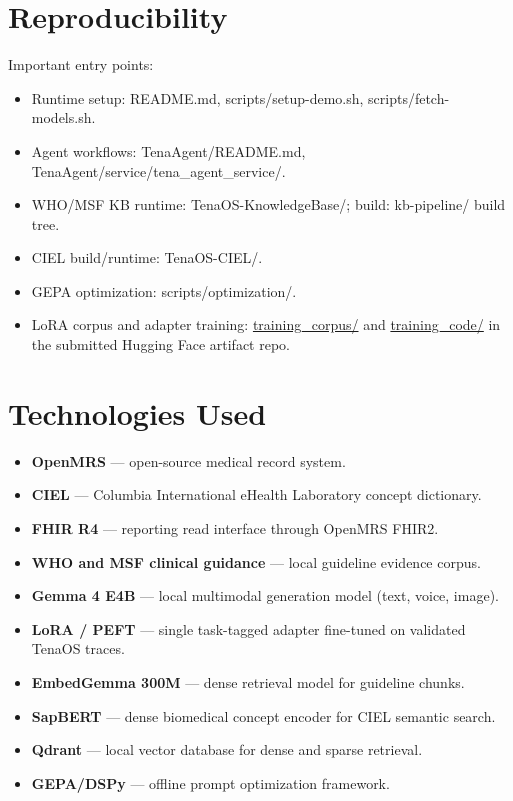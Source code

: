 \documentclass[11pt]{article}
\newcommand{\Product}{TenaOS}
\newcommand{\OpenMRS}{OpenMRS}
\newcommand{\CIEL}{CIEL}
\newcommand{\WHO}{WHO/MSF}
\newcommand{\code}[1]{{\setlength{\fboxsep}{1.7pt}\colorbox{codebg}{\textcolor{codeink}{\small\ttfamily #1}}}}
\begin{document}
\section{Reproducibility}

Important entry points:
\begin{itemize}
  \item Runtime setup: \code{README.md}, \code{scripts/setup-demo.sh}, \code{scripts/fetch-models.sh}.
  \item Agent workflows: \code{TenaAgent/README.md}, \code{TenaAgent/service/tena\_agent\_service/}.
  \item \WHO{} KB runtime: \code{TenaOS-KnowledgeBase/}; build: \code{kb-pipeline/} build tree.
  \item \CIEL{} build/runtime: \code{TenaOS-CIEL/}.
  \item GEPA optimization: \code{scripts/optimization/}.
  \item LoRA corpus and adapter training: \href{https://huggingface.co/beza4588/TenaOS/tree/main/training_corpus}{\code{training\_corpus/}} and \href{https://huggingface.co/beza4588/TenaOS/tree/main/training_code}{\code{training\_code/}} in the submitted Hugging Face artifact repo.
\end{itemize}

\section{Technologies Used}

\begin{itemize}
  \item \textbf{OpenMRS} --- open-source medical record system.
  \item \textbf{CIEL} --- Columbia International eHealth Laboratory concept dictionary.
  \item \textbf{FHIR R4} --- reporting read interface through \OpenMRS{} FHIR2.
  \item \textbf{WHO and MSF clinical guidance} --- local guideline evidence corpus.
  \item \textbf{Gemma 4 E4B} --- local multimodal generation model (text, voice, image).
  \item \textbf{LoRA / PEFT} --- single task-tagged adapter fine-tuned on validated \Product{} traces.
  \item \textbf{EmbedGemma 300M} --- dense retrieval model for guideline chunks.
  \item \textbf{SapBERT} --- dense biomedical concept encoder for \CIEL{} semantic search.
  \item \textbf{Qdrant} --- local vector database for dense and sparse retrieval.
  \item \textbf{GEPA/DSPy} --- offline prompt optimization framework.
\end{itemize}
\end{document}
